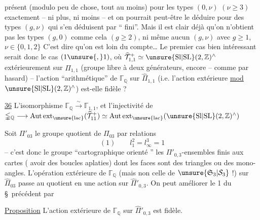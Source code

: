 présent (modulo peu de chose, tout au moins)
pour les types $(0,\nu)$ $(\nu\geq 3)$ exactement
-- ni plus, ni moins -- et on pourrait
peut-être le déduire pour des types $(g,\nu)$
qui s'en déduisent par `` fini''.
Mais il est clair déjà qu'on n'obtient
pas les types $(g,0)$ comme cela $(g\geq 2)$,
ni même aucun $(g,\nu)$ avec $g\geq 1$, $\nu\in\{0,1,2\}$
C'est dire qu'on est loin du compte\ldots
Le premier cas bien intéressant serait
donc le cas $(1\unsure{,}1)$, où
$\widehat{\mathcal{T}}_{1,1}^{+}\simeq
\unsure{\mathrm{Sl}|\mathrm{SL}}(2,\mathbb{Z})^{\wedge}$
 extérieurement sur $\widehat{\Pi}_{1,1}$
(groupe libre à deux générateurs, encore
-- comme par hasard) -- l'action
``arithmétique'' de $\mathbb{\Gamma}_{\mathbb{Q}}$ sur $\widehat{\Pi}_{1,1}$
(i.e. l'action extérieure \uline{mod}
$\unsure{\mathrm{Sl}|\mathrm{SL}}(2,\mathbb{Z})^{\wedge}$)
est-elle fidèle ?

\uline{36} L'isomorphisme
$\mathbb{\Gamma}_{\mathbb{Q}}\xrightarrow{\sim}\mathbb{\Gamma}_{1,1}$,
et l'injectivité de
$\mathbb{\Gamma}_{\mathbb{Q}}\longrightarrow
\mathrm{Aut\,ext}_{\unsure{\mathrm{lac}}}(\widehat{\mathcal{T}}_{11}^{+})
\simeq\mathrm{Aut\,ext}_{\unsure{\mathrm{lac}}}(\unsure{\mathrm{Sl}|\mathrm{SL}}(2,\mathbb{Z})^{\wedge})$

Soit $\Pi'_{03}$ le groupe quotient de $\Pi_{03}$
 par  relations
\[
(1)\qquad l_1^2=l_\infty^3=1
\]
-- c'est donc le groupe ``cartographique
orienté ''\unsure{,|;}
 les $\Pi'_{0,3}$-ensembles
finis   aux cartes
  ( avoir des
boucles aplaties) dont les faces sont des
triangles ou des mono-angles. L'opération
extérieure de $\mathbb{\Gamma}_{\mathbb{Q}}$
(mais non celle de $\unsure{\mathfrak{S}_3|\mathcal{S}_3}$ !)
sur $\widehat{\Pi}_{03}$ passe au quotient en une
action sur $\widehat{\Pi}'_{0,3}$. On peut améliorer le
 1 du \S\ précédent par 

\uline{Proposition} L'action extérieure de $\mathbb{\Gamma}_{\mathbb{Q}}$
sur $\widehat{\Pi}'_{0,3}$ est fidèle.

